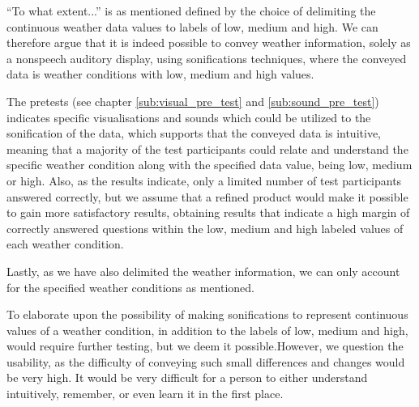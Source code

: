 “To what extent...” is as mentioned defined by the choice of delimiting the continuous weather data values to labels of low, medium and high. We can therefore argue that it is indeed possible to convey weather information, solely as a nonspeech auditory display, using sonifications techniques, where the conveyed data is weather conditions with low, medium and high values. 

The pretests (see chapter \ref{sub:visual_pre_test} and \ref{sub:sound_pre_test})  indicates specific visualisations and sounds which could be utilized to the sonification of the data, which supports that the conveyed data is intuitive, meaning that a majority of the test participants could relate and understand the specific weather condition along with the specified data value, being low, medium or high. Also, as the results indicate, only a limited number of test participants answered correctly, but we assume that a refined product would make it possible to gain more satisfactory results, obtaining results that indicate a high margin of correctly answered questions within the low, medium and high labeled values of each weather condition.

Lastly, as we have also delimited the weather information, we can only account for the specified weather conditions as mentioned.

To elaborate upon the possibility of making sonifications to represent continuous values of a weather condition, in addition to the labels of low, medium and high, would require further testing, but we deem it possible.However, we question the usability, as the difficulty of conveying such small differences and changes would be very high. It would be very difficult for a person to either understand intuitively, remember, or even learn it in the first place.


